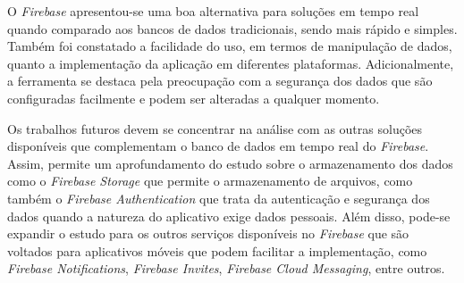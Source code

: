 \documentclass[12pt]{article}
\begin{document}
O \textit{Firebase} apresentou-se uma boa alternativa para soluções em tempo real quando comparado aos bancos de dados tradicionais, sendo mais rápido e simples. Também foi constatado a facilidade do uso, em termos de manipulação de dados, quanto a implementação da aplicação em diferentes plataformas. Adicionalmente, a ferramenta se destaca pela preocupação com a segurança dos dados que são configuradas facilmente e podem ser alteradas a qualquer momento.

Os trabalhos futuros devem se concentrar na análise com as outras soluções disponíveis que complementam o banco de dados em tempo real do \textit{Firebase}. Assim, permite um aprofundamento do estudo sobre o armazenamento dos dados como o \textit{Firebase Storage} que permite o armazenamento de arquivos, como também o \textit{Firebase Authentication} que trata da autenticação e segurança dos dados quando a natureza do aplicativo exige dados pessoais. Além disso, pode-se expandir o estudo para os outros serviços disponíveis no \textit{Firebase} que são voltados para aplicativos móveis que podem facilitar a implementação, como \textit{Firebase Notifications}, \textit{Firebase Invites}, \textit{Firebase Cloud Messaging}, entre outros.




\end{document}

